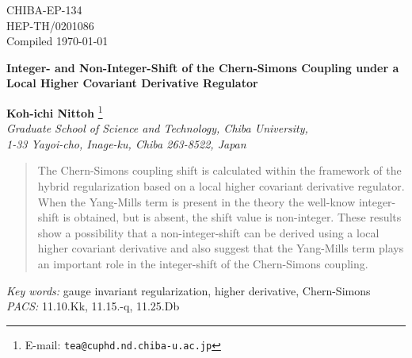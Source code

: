 \documentclass[a4paper,12pt]{article}
\begin{document}
\begin{flushright}			%
       CHIBA-EP-134\\
       HEP-TH/0201086\\
       \tiny{Compiled \today}
\end{flushright}
\begin{center}

\renewcommand{\thefootnote}{\fnsymbol{footnote}}

{
\Large \sffamily \bfseries%
  {%
Integer- and Non-Integer-Shift of
the Chern-Simons Coupling under
a Local Higher Covariant Derivative Regulator
  }
}

\vspace{18pt}
{\large \sffamily \bfseries {Koh-ichi Nittoh}}
      \footnote{E-mail: \texttt{tea@cuphd.nd.chiba-u.ac.jp}}
\\
{\small\it
Graduate School of Science and Technology, Chiba University,\\
1-33 Yayoi-cho, Inage-ku, Chiba 263-8522, Japan}\\
\end{center}\vspace{18pt}
\begin{abstract}
The Chern-Simons coupling shift is calculated
within the framework of the hybrid regularization
based on a local higher covariant derivative regulator.
%
When the Yang-Mills term is present in the theory
the well-know integer-shift is obtained,
but is absent, the shift value is non-integer.
%
These results
show a possibility
that a non-integer-shift can be derived
using a local higher covariant derivative
and also suggest that the Yang-Mills term plays an important role
in the integer-shift of the Chern-Simons coupling.
\end{abstract}
\vspace{12pt}
{
\noindent
\textit{Key words:}
gauge invariant regularization, higher derivative, Chern-Simons\\
\textit{PACS:}
11.10.Kk, 11.15.-q, 11.25.Db
}
\vspace{18pt}


\renewcommand{\thefootnote}{\fnsymbol{footnote}}

\label{sec:introduction}
\end{document}
